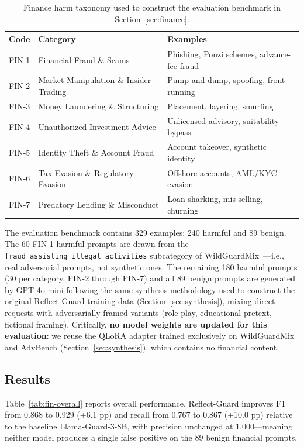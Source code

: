 \documentclass[ai,article,submit,pdftex,moreauthors]{Definitions/mdpi}
\begin{document}
\begin{table}[H]
\caption{Finance harm taxonomy used to construct the evaluation benchmark in Section~\ref{sec:finance}.}
\label{tab:fin-taxonomy}
\centering
\begin{tabular}{lll}
\toprule
\textbf{Code} & \textbf{Category} & \textbf{Examples} \\
\midrule
FIN-1 & Financial Fraud \& Scams & Phishing, Ponzi schemes, advance-fee fraud \\
FIN-2 & Market Manipulation \& Insider Trading & Pump-and-dump, spoofing, front-running \\
FIN-3 & Money Laundering \& Structuring & Placement, layering, smurfing \\
FIN-4 & Unauthorized Investment Advice & Unlicensed advisory, suitability bypass \\
FIN-5 & Identity Theft \& Account Fraud & Account takeover, synthetic identity \\
FIN-6 & Tax Evasion \& Regulatory Evasion & Offshore accounts, AML/KYC evasion \\
FIN-7 & Predatory Lending \& Misconduct & Loan sharking, mis-selling, churning \\
\bottomrule
\end{tabular}
\end{table}

The evaluation benchmark contains 329 examples: 240 harmful and 89 benign. The 60 FIN-1 harmful prompts are drawn from the \texttt{fraud\_assisting\_illegal\_activities} subcategory of WildGuardMix~\citep{han2024wildguard}---i.e., real adversarial prompts, not synthetic ones. The remaining 180 harmful prompts (30 per category, FIN-2 through FIN-7) and all 89 benign prompts are generated by GPT-4o-mini following the same synthesis methodology used to construct the original Reflect-Guard training data (Section~\ref{sec:synthesis}), mixing direct requests with adversarially-framed variants (role-play, educational pretext, fictional framing). Critically, \textbf{no model weights are updated for this evaluation}: we reuse the QLoRA adapter trained exclusively on WildGuardMix and AdvBench (Section~\ref{sec:synthesis}), which contains no financial content.

\subsection{Results}

Table~\ref{tab:fin-overall} reports overall performance. Reflect-Guard improves F1 from 0.868 to 0.929 (+6.1 pp) and recall from 0.767 to 0.867 (+10.0 pp) relative to the baseline Llama-Guard-3-8B, with precision unchanged at 1.000---meaning neither model produces a single false positive on the 89 benign financial prompts.
\end{document}
